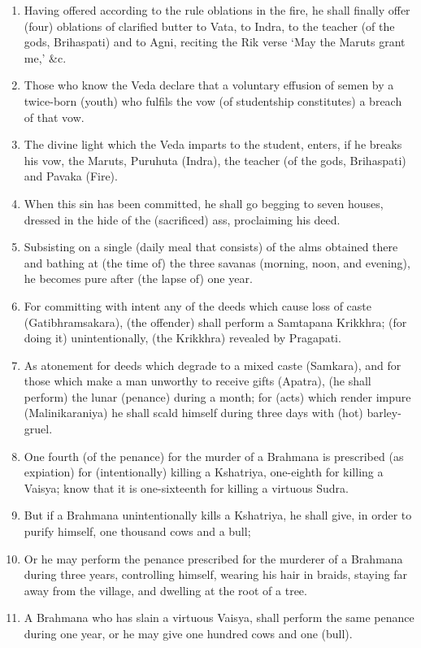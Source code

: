 \begin{enumerate}
\item Having offered according to the rule oblations in the fire, he shall finally offer (four) oblations of clarified butter to Vata, to Indra, to the teacher (of the gods, Brihaspati) and to Agni, reciting the Rik verse `May the Maruts grant me,' \&c.
\item Those who know the Veda declare that a voluntary effusion of semen by a twice-born (youth) who fulfils the vow (of studentship constitutes) a breach of that vow.
\item The divine light which the Veda imparts to the student, enters, if he breaks his vow, the Maruts, Puruhuta (Indra), the teacher (of the gods, Brihaspati) and Pavaka (Fire).
\item When this sin has been committed, he shall go begging to seven houses, dressed in the hide of the (sacrificed) ass, proclaiming his deed.
\item Subsisting on a single (daily meal that consists) of the alms obtained there and bathing at (the time of) the three savanas (morning, noon, and evening), he becomes pure after (the lapse of) one year.
\item For committing with intent any of the deeds which cause loss of caste (Gatibhramsakara), (the offender) shall perform a Samtapana Krikkhra; (for doing it) unintentionally, (the Krikkhra) revealed by Pragapati.
\item As atonement for deeds which degrade to a mixed caste (Samkara), and for those which make a man unworthy to receive gifts (Apatra), (he shall perform) the lunar (penance) during a month; for (acts) which render impure (Malinikaraniya) he shall scald himself during three days with (hot) barley-gruel.
\item One fourth (of the penance) for the murder of a Brahmana is prescribed (as expiation) for (intentionally) killing a Kshatriya, one-eighth for killing a Vaisya; know that it is one-sixteenth for killing a virtuous Sudra.
\item But if a Brahmana unintentionally kills a Kshatriya, he shall give, in order to purify himself, one thousand cows and a bull;
\item Or he may perform the penance prescribed for the murderer of a Brahmana during three years, controlling himself, wearing his hair in braids, staying far away from the village, and dwelling at the root of a tree.
\item A Brahmana who has slain a virtuous Vaisya, shall perform the same penance during one year, or he may give one hundred cows and one (bull).

\end{enumerate}
